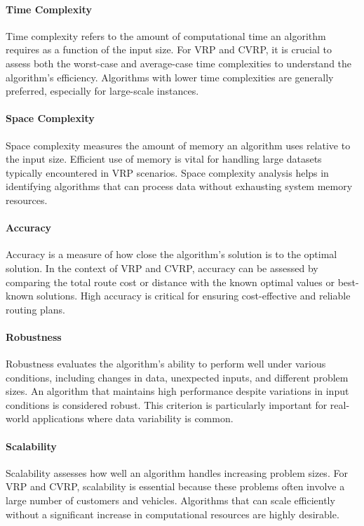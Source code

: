 \documentclass[
]{article}
\begin{document}
\paragraph{Time Complexity}
Time complexity refers to the amount of computational time an algorithm requires as a function of the input size. For VRP and CVRP, it is crucial to assess both the worst-case and average-case time complexities to understand the algorithm's efficiency. Algorithms with lower time complexities are generally preferred, especially for large-scale instances.

\paragraph{Space Complexity}
Space complexity measures the amount of memory an algorithm uses relative to the input size. Efficient use of memory is vital for handling large datasets typically encountered in VRP scenarios. Space complexity analysis helps in identifying algorithms that can process data without exhausting system memory resources.

\paragraph{Accuracy}
Accuracy is a measure of how close the algorithm's solution is to the optimal solution. In the context of VRP and CVRP, accuracy can be assessed by comparing the total route cost or distance with the known optimal values or best-known solutions. High accuracy is critical for ensuring cost-effective and reliable routing plans.

\paragraph{Robustness}
Robustness evaluates the algorithm's ability to perform well under various conditions, including changes in data, unexpected inputs, and different problem sizes. An algorithm that maintains high performance despite variations in input conditions is considered robust. This criterion is particularly important for real-world applications where data variability is common.

\paragraph{Scalability}
Scalability assesses how well an algorithm handles increasing problem sizes. For VRP and CVRP, scalability is essential because these problems often involve a large number of customers and vehicles. Algorithms that can scale efficiently without a significant increase in computational resources are highly desirable.
\end{document}
